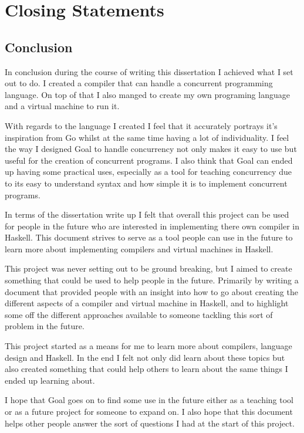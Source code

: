 
\chapter{Closing Statements}

\section{Conclusion}

In conclusion during the course of writing this dissertation I achieved what I set out to do. I created a compiler that can handle a concurrent programming language. On top of that I also manged to create my own programing language and a virtual machine to run it. 

With regards to the language I created I feel that it accurately portrays it's inspiration from Go whilst at the same time having a lot of individuality. I feel the way I designed Goal to handle concurrency not only makes it easy to use but useful for the creation of concurrent programs. I also think that Goal can ended up having some practical uses, especially as a tool for teaching concurrency due to its easy to understand syntax and how simple it is to implement concurrent programs.

In terms of the dissertation write up I felt that overall this project can be used for people in the future who are interested in implementing there own compiler in Haskell. This document strives to serve as a tool people can use in  the future to learn more about implementing compilers and virtual machines in Haskell.

This project was never setting out to be ground breaking, but I aimed to create something that could be used to help people in the future. Primarily by writing a document that provided people with an insight into how to go about creating the different aspects of a compiler and virtual machine in Haskell, and to highlight some off the different approaches available to someone tackling this sort of problem in the future.

This project started as a means for me to learn more about compilers, language design and Haskell. In the end I felt not only did learn about these topics but also created something that could help others to learn about the same things I ended up learning about. 

I hope that Goal goes on to find some use in the future either as a teaching tool or as a future project for someone to expand on. I also hope that this document helps other  people answer the sort of questions I had at the start of this project. 


